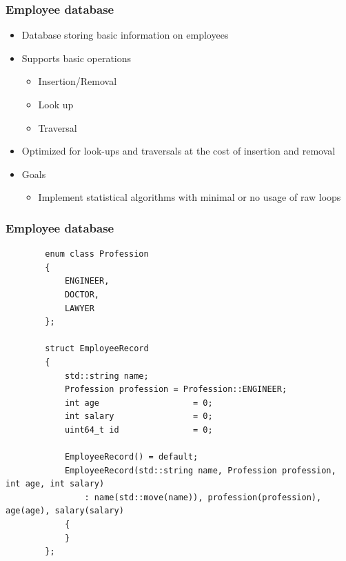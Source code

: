 \documentclass{beamer}
\begin{document}
\begin{frame}
\frametitle{Employee database}
\begin{itemize}
	\item Database storing basic information on employees
	\item Supports basic operations
	\begin{itemize}
		\item Insertion/Removal
		\item Look up
		\item Traversal
	\end{itemize}
	\item Optimized for look-ups and traversals at the cost of insertion and removal
	\item Goals
	\begin{itemize}
		\item Implement statistical algorithms with minimal or no usage of raw loops
	\end{itemize}
\end{itemize}
\end{frame}

\begin{frame}[fragile,t]
\frametitle{Employee database}
	\begin{lstlisting}
		enum class Profession
		{
		    ENGINEER,
		    DOCTOR,
		    LAWYER
		};
		
		struct EmployeeRecord
		{
		    std::string name;
		    Profession profession = Profession::ENGINEER;
		    int age                   = 0;
		    int salary                = 0;
		    uint64_t id               = 0;
		
		    EmployeeRecord() = default;
		    EmployeeRecord(std::string name, Profession profession, int age, int salary)
		        : name(std::move(name)), profession(profession), age(age), salary(salary)
		    {
		    }
		};

	\end{lstlisting}
\end{frame}
\end{document}
